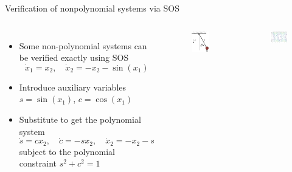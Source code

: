 \documentclass[aspectratio=169]{beamer}
\begin{document}
\begin{frame}{Verification of nonpolynomial systems via SOS
\href{https://colab.research.google.com/github/TobiaMarcucci/optimal_control_pisa/blob/master/demos/lyapunov_pendulum.ipynb}{}}
\begin{columns}
\begin{itemize}
\item
Some non-polynomial systems can be verified exactly using SOS\footnotemark
$$
\dot x_1 = x_2, \quad
\dot x_2 = - x_2 - \sin(x_1)
$$
\item
Introduce auxiliary variables $s = \sin(x_1)$, $c = \cos(x_1)$
\item
Substitute to get the polynomial system
$$
\dot s = c x_2, \quad
\dot c = - s x_2, \quad
\dot x_2 = - x_2 - s
$$
subject to the polynomial constraint $s^2 + c^2 = 1$
\end{itemize}
\begin{figure}[h]
\includegraphics[width=.3\columnwidth]{figures/simple_pend.png}
\end{figure}
\begin{figure}[h]
	\includegraphics[width=\columnwidth]{figures/lyapunov_pendulum.pdf}
\end{figure}
\end{columns}
\end{frame}
\end{document}
